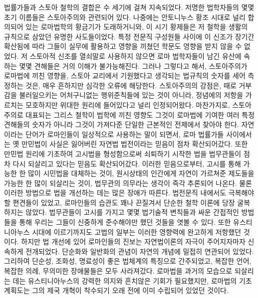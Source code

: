 법률가들과 스토아 철학의 결합은 수 세기에 걸쳐 지속되었다.
저명한 법학자들의 몇몇 초기 이름들은 스토아주의와 관련되어 있다.
나중에는 안토니누스 황조 시대로 널리 합의되어 있는
로마법학의 황금기가 도래하거니와,
이 시기 황제들은 저 철학을 생활의 규칙으로 삼았던 유명한 사도들이었다.
특정 전문직 구성원들 사이에 이 신조가 장기간 확산됨에 따라
그들이 실무에 활용하고 영향을 끼쳤던 학문도 영향을 받지 않을 수 없었다.
저 스토아적 신조를 열쇠말로 사용하지 않으면
로마 법학자들이 남긴 유산에 속하는 몇몇 견해들은 거의 이해가 불가능해진다.
그러나 그렇다고 해서,
스토아주의가 로마법에 끼친 영향을,
스토아 교리에서 기원했다고 생각되는 법규칙의 숫자를 세어 측정하는 것은,
매우 흔하지만 심각한 오류에 해당한다.
스토아주의의 강점은,
때로 거부감을 불러일으키는 어처구니없는 행위준칙들에 있는 것이 아니라,
정념에의 저항을 가르치는 모호하지만 위대한 원리에 들어있다고 널리 인정되어왔다.
마찬가지로, 스토아주의로 대표되는 그리스 철학이 법학에 끼친 영향도
그것이 로마법에 기여한 여러 특정 견해들의 숫자가 아니라
그것이 가져다준 단일한 근본적인 전제에서 찾아야 한다.
자연이라는 단어가 로마인들이 일상적으로 사용하는 말이 되면서,
로마 법률가들 사이에서는
옛 만민법이 사실은 잃어버린 자연법 법전이라는 믿음이
점차 확산되어갔다.
또한 만민법 원리에 기초하여 고시법을 형성함으로써
쇠퇴하기 시작한 법을 법무관들이 점차 다시 되살리고 있다는 믿음도 확산되어갔다.
이러한 믿음으로부터,
고시를 통해 가능한 한 많이 시민법을 대체하는 것이,
원시상태의 인간에게 자연이 가르쳐준 제도들을 가능한 한 많이 되살리는 것이,
법무관의 의무라는 생각이 즉각 추론되어 나온다.
물론 이러한 방법으로 법을 개선하는 데는 많은 장애가 따른다.
법전문직 내에서도 극복해야할 편견들이 있었고,
로마인들의 습관도 꽤나 끈질겨서 단순한 철학 이론에 당장 굴복하지는 않았다.
법무관들이 고시를 가지고 몇몇 법기술적 변칙들과 싸운 간접적인 방법들을 통해
우리는 그들이 신중하게 준수해야만 했던 것들을 엿볼 수 있다.
또한 유스티니아누스 시대에 이르기까지도 고법의 일부는
이러한 영향력에 완고하게 저항했던 것이다.
하지만 법 개선에 있어 로마인들의 진보는
자연법이론의 자극이 주어지자마자 신속하게 전개되었다.
단순화와 일반화의 관념이 자연의 개념에 밀접히 연관되어 있었다.
그리하여 단순성, 조화성, 명료성이 좋은 법체계의 특징으로 간주되었고,
복잡한 언어, 복잡한 의례, 무의미한 장애물들은
모두 사라져갔다.
로마법을 과거의 모습으로 되살리는 데는
유스티니아누스의 강력한 의지와 흔치않은 기회가 필요했지만,
로마법의 기초 계획도는 그의 제국 개혁이 착수되기 오래 전에
이미 수립되어 있었던 것이다.

